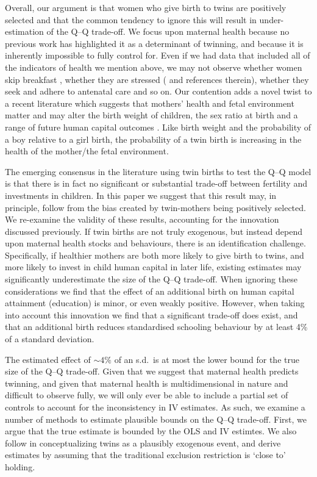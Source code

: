 \documentclass[subeqn]{article}
\begin{document}
\begin{spacing}{1.4}
Overall, our argument is that women who give birth to twins are positively 
selected and that the common tendency to ignore this will result in under-%
estimation of the Q--Q trade-off. We focus upon maternal health because no 
previous work has highlighted it as a determinant of twinning, and because it is 
inherently impossible to fully control for. Even if we had data that included 
all of the indicators of health we mention above, we may not observe whether 
women skip breakfast \citep{MazumderSeeskin2014}, whether they are stressed 
(\citet{Blacketal2014} and references therein), whether they seek and adhere to 
antenatal care and so on. Our contention adds a novel twist to a recent 
literature which suggests that mothers' health and fetal environment matter and 
may alter the birth weight of children, the sex ratio at birth and a range of 
future human capital outcomes \citep{Almondetal2011,BhalotraRawlings2013,
Barker1995}. Like birth weight and the probability of a boy relative to a girl 
birth, the probability of a twin birth is increasing in the health of the 
mother/the fetal environment.

The emerging consensus in the literature using twin births to test the Q--Q 
model is that there is in fact no significant or substantial trade-off between 
fertility and investments in children. In this paper we suggest that this result 
may, in principle, follow from the bias created by twin-mothers being positively 
selected. We re-examine the validity of these results, accounting for the 
innovation discussed previously.  If twin births are not truly exogenous, but 
instead depend upon maternal health stocks and behaviours, there is an 
identification challenge.  Specifically, if healthier mothers are both more 
likely to give birth to twins, and more likely to invest in child human capital 
in later life, existing estimates may significantly underestimate the size of 
the Q--Q trade-off.  When ignoring these considerations we find that the effect 
of an additional birth on human capital attainment (education) is minor, or even 
weakly positive. However, when taking into account this innovation we find that 
a significant trade-off does exist, and that an additional birth reduces 
standardised schooling behaviour by at least 4\% of a standard deviation.

The estimated effect of $\sim 4\%$ of an s.d.\ is at most the lower bound for 
the true size of the Q--Q trade-off. Given that we suggest that maternal health 
predicts twinning, and given that maternal health is multidimensional in nature 
and difficult to observe fully, we will only ever be able to include a partial 
set of controls to account for the inconsistency in IV estimates. As such, we 
examine a number of methods to estimate plausible bounds on the Q--Q trade-off. 
First, we argue that the true estimate is bounded by the OLS and IV estimtes. 
We also follow \citet{Conleyetal2012} in conceptualizing twins as a plausibly 
exogenous event, and derive estimates by assuming that the traditional exclusion 
restriction is `close to' holding.


\end{spacing}
\end{document}
